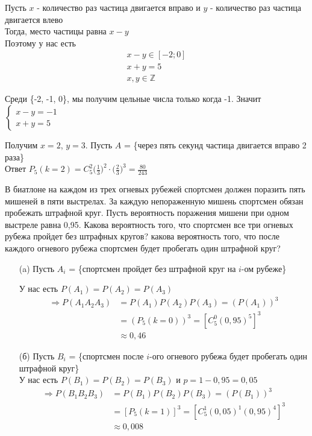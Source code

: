 \begin{exercise}[13]
	Пусть $x$ - количество раз частица двигается вправо и $y$ - количество раз частица двигается влево \\ Тогда, место частицы равна $x-y$ \\ Поэтому у нас есть 
	\begin{align*}
		x - y \in [-2; 0] \\ x + y = 5 \\ x, y \in \mathbb{Z}
	\end{align*}

	Среди \{-2, -1, 0\}, мы получим цельные числа только когда -1. Значит
	$\begin{cases}
		x - y = -1 \\ x + y = 5
	\end{cases}$

	Получим $x=2$, $y=3$. Пусть $A$ = \{через пять секунд частица двигается вправо 2 раза\} \\ Ответ $P_5 (k = 2) = C^2_5 \Big(\frac{1}{3}\Big)^2 \cdot \Big(\frac{2}{3}\Big)^3 = \frac{80}{243}$
\end{exercise}

\begin{exercise}[14] В биатлоне на каждом из трех огневых рубежей спортсмен должен поразить пять мишеней в пяти выстрелах. За каждую непораженную мишень спортсмен обязан пробежать штрафной круг. Пусть вероятность поражения мишени при одном выстреле равна 0,95. Какова вероятность того, что спортсмен все три огневых рубежа пройдет без штрафных кругов? какова вероятность того, что после каждого огневого рубежа спортсмен будет пробегать один штрафной круг?
	\begin{enumerate}
		\item [(a)] Пусть $A_i$ = \{спортсмен пройдет без штрафной круг на $i$-ом рубеже\}
		
		У нас есть $P(A_1) = P(A_2) = P(A_3)$
		\begin{align*}
			\Rightarrow P(A_1 A_2 A_3) & = P(A_1) P(A_2) P(A_3) = (P(A_1))^3 \\ & = (P_5(k=0))^3 = [C^0_5 (0,95)^5]^3 \\ & \approx 0,46
		\end{align*}
		\item [(б)] Пусть $B_i$ = \{спортсмен после $i$-ого огневого рубежа будет пробегать один штрафной круг\} \\ У нас есть $P(B_1) = P(B_2) = P(B_3)$ и $p=1-0,95=0,05$
		\begin{align*}
			\Rightarrow P(B_1 B_2 B_3) & = P(B_1) P(B_2) P(B_3) = (P(B_1))^3 \\ & = [P_5 (k=1)]^3 = [C^1_5 (0,05)^1 (0,95)^4]^3 \\ & \approx 0,008
		\end{align*}
	\end{enumerate}
\end{exercise}

